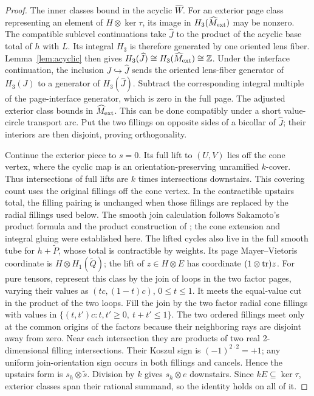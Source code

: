 \begin{proof}
The inner classes bound in the acyclic
\(\widehat W\). For an exterior page class
representing an element of \(H\otimes\ker\tau\),
its image in \(H_3(\widehat M_{\rm ext})\)
may be nonzero. The compatible sublevel continuations take \(\widehat J\) to
the product of the acyclic base total of \(h\) with \(L\).
Its integral \(H_3\) is therefore generated by one oriented lens
fiber. Lemma~\ref{lem:acyclic} then gives
\(H_3(\widehat J)\cong H_3(\widehat M_{\rm ext})\cong\mathbb Z\). Under the interface continuation, the
inclusion \(J\hookrightarrow\widehat J\) sends the oriented
lens-fiber generator of \(H_3(J)\) to a generator of
\(H_3(\widehat J)\). Subtract the
corresponding integral multiple of the
page-interface generator, which is zero
in the full page. The adjusted exterior
class bounds in \(\widehat M_{\rm ext}\).
This can be done compatibly under a short
value-circle transport arc. Put the two
fillings on opposite sides of a bicollar
of \(\widehat J\); their interiors are then
disjoint, proving orthogonality.

Continue the exterior piece to \(s=0\).
Its full lift to \((U,V)\) lies off the
cone vertex, where the cyclic map is an
orientation-preserving unramified \(k\)-cover.
Thus intersections of full lifts are \(k\)
times intersections downstairs. This covering count uses the
original fillings off the cone vertex. In the contractible
upstairs total, the filling pairing is unchanged when those
fillings are replaced by the radial fillings used below.
The smooth join calculation follows Sakamoto's product formula
\cite[Theorem~2, p.~715]{Sakamoto1974} and the product construction of
\cite{KauffmanNeumann1977}; the cone extension
and integral gluing were established here. The lifted cycles
also live in the full smooth tube
for \(h+\widetilde P\), whose total is
contractible by weights. Its page
Mayer--Vietoris coordinate is
\(H\otimes H_1(\widetilde Q)\);
the lift of \(z\in H\otimes E\) has
coordinate \((1\otimes\operatorname{tr})z\).
For pure tensors, represent this class
by the join of loops in the two factor
pages, varying their values as
\((tc,(1-t)c)\), \(0\le t\le1\).
It meets the equal-value cut in the
product of the two loops. Fill the join
by the two factor radial cone fillings
with values in
\(\{(t,t')c:t,t'\ge0,\ t+t'\le1\}\).
The two ordered fillings meet only at
the common origins of the factors
because their neighboring rays are
disjoint away from zero. Near each
intersection they are products of
two real 2-dimensional filling
intersections. Their Koszul sign is
\((-1)^{2\cdot2}=+1\); any uniform
join-orientation sign occurs in both
fillings and cancels. Hence the upstairs
form is \(s_h\otimes\widetilde s\).
Division by \(k\) gives \(s_h\otimes e\)
downstairs. Since \(kE\subseteq\ker\tau\), exterior classes span their
rational summand, so the identity holds
on all of it.
\end{proof}

